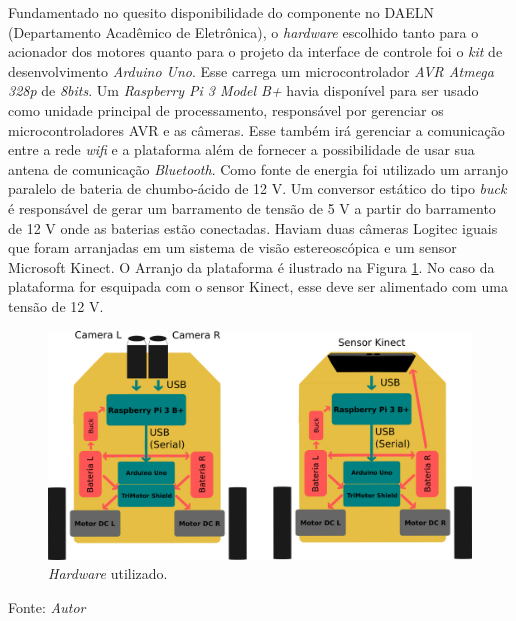 Fundamentado no quesito disponibilidade do componente no DAELN (Departamento Acadêmico de Eletrônica), o \textit{hardware} escolhido tanto para o acionador dos motores quanto para o projeto da interface de controle foi o \textit{kit} de desenvolvimento \textit{Arduino Uno}. Esse carrega um microcontrolador \textit{AVR Atmega 328p} de \textit{8bits}.
Um \textit{Raspberry Pi 3 Model B+} havia disponível para ser usado como unidade principal de processamento, responsável por gerenciar os microcontroladores AVR e as câmeras. Esse também irá gerenciar a comunicação entre a rede \textit{wifi} e a plataforma além de fornecer a possibilidade de usar sua antena de comunicação \textit{Bluetooth}. Como fonte de energia foi utilizado um arranjo paralelo de bateria de chumbo-ácido de 12 V.
Um conversor estático do tipo \textit{buck} é responsável de gerar um barramento de tensão de 5 V a partir do barramento de 12 V onde as baterias estão conectadas. Haviam duas câmeras Logitec iguais que foram arranjadas em um sistema de visão estereoscópica e um sensor Microsoft Kinect. O Arranjo da plataforma é ilustrado na Figura \ref{fig:hardware_utilizado}. No caso da plataforma for esquipada com o sensor Kinect, esse deve ser alimentado com uma tensão de 12 V.

\begin{figure}[!htb]
  \centering
  \caption{\textit{Hardware} utilizado.}
  \label{fig:hardware_utilizado}
  \includegraphics[width=1\textwidth]{./img/projeto/hardware_utilizado.png}
\end{figure}
Fonte: \textit{Autor}

\pagebreak

